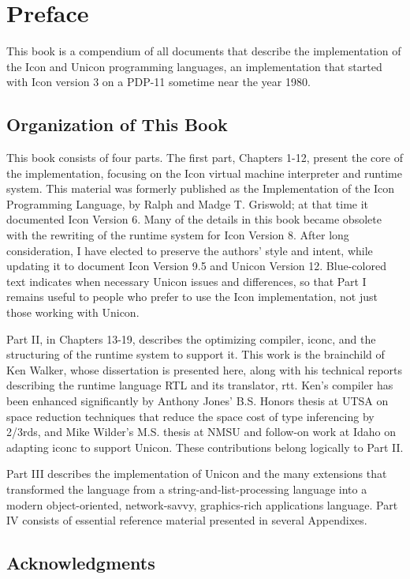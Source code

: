 \chapter{Preface}

This book is a compendium of all documents that describe the
implementation of the Icon and Unicon programming languages, an
implementation that started with Icon version 3 on a PDP-11 sometime
near the year 1980.

\section*{Organization of This Book}

This book consists of four parts. The first part, Chapters 1-12,
present the core of the implementation, focusing on the Icon virtual
machine interpreter and runtime system. This material was formerly
published as the Implementation of the Icon Programming Language, by
Ralph and Madge T. Griswold; at that time it documented Icon Version
6. Many of the details in this book became obsolete with the rewriting
of the runtime system for Icon Version 8. After long consideration, I
have elected to preserve the authors' style and intent, while updating
it to document Icon Version 9.5 and Unicon Version 12. Blue-colored
text indicates when necessary Unicon issues and differences, so that
Part I remains useful to people who prefer to use the Icon
implementation, not just those working with Unicon.

Part II, in Chapters 13-19, describes the optimizing compiler, iconc,
and the structuring of the runtime system to support it. This work is
the brainchild of Ken Walker, whose dissertation is presented here,
along with his technical reports describing the runtime language RTL
and its translator, rtt. Ken's compiler has been enhanced
significantly by Anthony Jones' B.S. Honors thesis at UTSA on space
reduction techniques that reduce the space cost of type inferencing by
2/3rds, and Mike Wilder's M.S. thesis at NMSU and follow-on work at
Idaho on adapting iconc to support Unicon. These contributions belong
logically to Part II.

Part III describes the implementation of Unicon and the many
extensions that transformed the language from a
string-and-list-processing language into a modern object-oriented,
network-savvy, graphics-rich applications language.  Part IV consists
of essential reference material presented in several Appendixes.

\section*{Acknowledgments}

